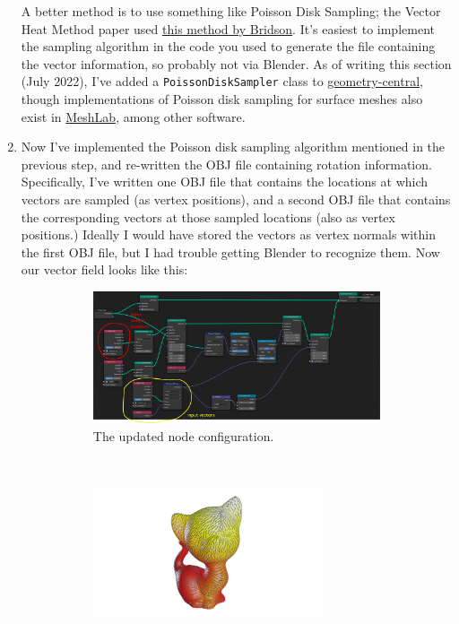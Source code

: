 \documentclass[10pt]{article}
\begin{document}
\begin{enumerate}
\begin{figure}[H]
        \label{fig:vector_instance_random-cull}
    \end{figure}
    A better method is to use something like Poisson Disk Sampling; the Vector Heat Method paper used \href{https://www.cs.ubc.ca/~rbridson/docs/bridson-siggraph07-poissondisk.pdf}{this method by Bridson}. It's easiest to implement the sampling algorithm in the code you used to generate the file containing the vector information, so probably not via Blender. As of writing this section (July 2022), I've added a \texttt{PoissonDiskSampler} class to \href{https://geometry-central.net/}{geometry-central}, though implementations of Poisson disk sampling for surface meshes also exist in \href{https://www.meshlab.net/}{MeshLab}, among other software.
    \item Now I've implemented the Poisson disk sampling algorithm mentioned in the previous step, and re-written the OBJ file containing rotation information. Specifically, I've written one OBJ file that contains the locations at which vectors are sampled (as vertex positions), and a second OBJ file that contains the corresponding vectors at those sampled locations (also as vertex positions.) Ideally I would have stored the vectors as vertex normals within the first OBJ file, but I had trouble getting Blender to recognize them. Now our vector field looks like this:
    \begin{figure}[H]
        \centering
        \captionsetup{width=0.8\textwidth}
        \begin{subfigure}[b]{\textwidth}
         \centering
         \includegraphics[width=\textwidth]{images/vector_instance_sampled-nodes.png}
         \caption{The updated node configuration.}
        \end{subfigure} \\
        \begin{subfigure}[b]{\textwidth}
         \centering
         \includegraphics[width=0.8\textwidth]{images/vector_instance_poisson-sampled.png}

\end{subfigure}
\end{figure}
\end{enumerate}
\end{document}
